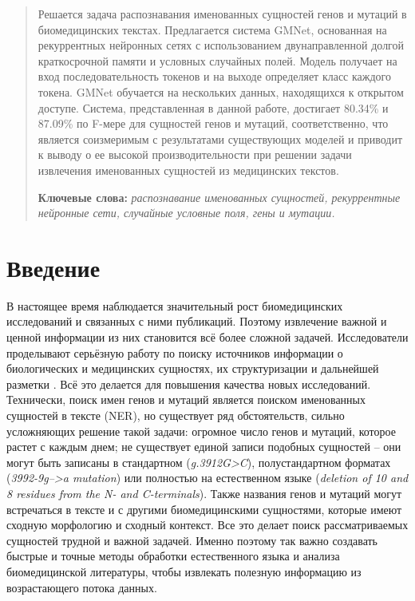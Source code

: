 \documentclass[12pt, a4paper]{article} %
\begin{document}
\newpage
\begin{abstract}
	Решается задача распознавания именованных сущностей генов и мутаций в биомедицинских текстах. Предлагается система GMNet, основанная на рекуррентных нейронных сетях с использованием двунаправленной долгой краткосрочной памяти и условных случайных полей. Модель получает на вход последовательность токенов и на выходе определяет класс каждого токена. GMNet обучается на нескольких данных, находящихся к открытом доступе. Система, представленная в данной работе, достигает 80.34\% и 87.09\% по F-мере для сущностей генов и мутаций, соответственно, что является соизмеримым с результатами существующих моделей и приводит к выводу о ее высокой производительности при решении задачи извлечения именованных сущностей из медицинских текстов. 
	
	\bigskip
	\textbf{Ключевые слова:} \textit{распознавание именованных сущностей, рекуррентные нейронные сети, случайные условные поля, гены и мутации.}
\end{abstract}


\newpage
\tableofcontents
 


\newpage
\section{Введение}
В настоящее время наблюдается значительный рост биомедицинских исследований и связанных с ними публикаций. Поэтому извлечение важной и ценной информации из них становится всё более сложной задачей. Исследователи проделывают серьёзную работу по поиску источников информации о биологических и медицинских сущностях, их структуризации и дальнейшей разметки \cite{Galea2018a}. Всё это делается для повышения качества новых исследований. Технически, поиск имен генов и мутаций является поиском именованных сущностей в тексте (NER), но существует ряд обстоятельств, сильно усложняющих решение такой задачи: огромное число генов и мутаций, которое растет с каждым днем; не существует единой записи подобных сущностей -- они могут быть записаны в стандартном (\textit{g.3912G>C}), полустандартном форматах (\textit{3992-9g–>a mutation}) или полностью на естественном языке (\textit{deletion of 10 and 8 residues from the N- and
C-terminals}). Также названия генов и мутаций могут встречаться в тексте и с другими биомедицинскими сущностями, которые имеют сходную морфологию и сходный контекст. Все это делает поиск рассматриваемых сущностей трудной и важной задачей.  Именно поэтому так важно создавать быстрые и точные методы обработки естественного языка и анализа биомедицинской литературы, чтобы извлекать полезную информацию из возрастающего потока данных.
\end{document}
